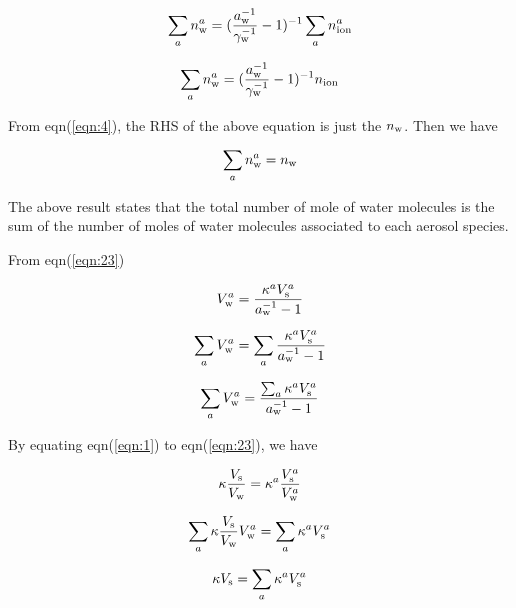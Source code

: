 \documentclass[12pt]{article}
\begin{document}
\begin{equation}
\sum_{a} n_{\rm w}^{a}=(\frac{a_{\rm w}^{-1}}{\gamma_{\rm w}^{-1}}-1)^{-1}\sum_{a}n_{\rm ion}^{a}
\end{equation}

\begin{equation}
\sum_{a} n_{\rm w}^{a}=(\frac{a_{\rm w}^{-1}}{\gamma_{\rm w}^{-1}}-1)^{-1} n_{\rm ion}
\end{equation}

From eqn(\ref{eqn:4}), the RHS of the above equation is just the $n_{\rm w}$. Then we have 

\begin{equation}
\sum_{a} n_{\rm w}^{a}=n_{\rm w}
\end{equation}

The above result states that the total number of mole of water molecules is the sum of the number of moles of water molecules associated to each aerosol species. 

From eqn(\ref{eqn:23})

\begin{equation}
V_{\rm w}^{a}=\frac{\kappa^{a} V_{\rm s}^{a}}{a_{\rm w}^{-1}-1}
\end{equation}

\begin{equation}
\sum_{a}V_{\rm w}^{a}  =\sum_{a}\frac{\kappa^{a} V_{\rm s}^{a}}{a_{\rm w}^{-1}-1}
\end{equation}

\begin{equation}
\sum_{a}V_{\rm w}^{a}  =\frac{\sum_{a}\kappa^{a} V_{\rm s}^{a}}{a_{\rm w}^{-1}-1}
\end{equation}




By equating eqn(\ref{eqn:1}) to eqn(\ref{eqn:23}), we have

\begin{equation}\label{eqn:28}
\kappa \frac{V_{\rm s}}{V_{\rm w}}= \kappa^{a} \frac{V_{\rm s}^{a}}{V_{\rm w}^{a}}
\end{equation}

\begin{equation}\label{eqn:29}
\sum_{a} \kappa \frac{V_{\rm s}}{V_{\rm w}} V_{\rm w}^{a}= \sum_{a} \kappa^{a} V_{\rm s}^{a}
\end{equation}

\begin{equation}\label{eqn:30}
\kappa V_{\rm s}= \sum_{a} \kappa^{a} V_{\rm s}^{a}
\end{equation}
\end{document}
